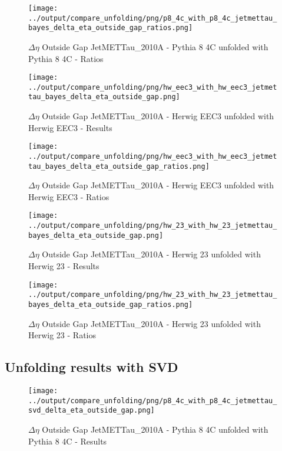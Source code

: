 \documentclass[11pt]{book}
\begin{document}
\begin{figure}[ht]
\centering
\texttt{[image: ../output/compare\_unfolding/png/p8\_4c\_with\_p8\_4c\_jetmettau\_bayes\_delta\_eta\_outside\_gap\_ratios.png]}
\caption{$\Delta\eta$ Outside Gap JetMETTau\_2010A - Pythia 8 4C unfolded with Pythia 8 4C - Ratios}
\label{p8_p8_jetmettau_bayes_delta_eta_outside_gap_b}
\end{figure}

\begin{figure}[ht]
\centering
\texttt{[image: ../output/compare\_unfolding/png/hw\_eec3\_with\_hw\_eec3\_jetmettau\_bayes\_delta\_eta\_outside\_gap.png]}
\caption{$\Delta\eta$ Outside Gap JetMETTau\_2010A - Herwig EEC3 unfolded with Herwig EEC3 - Results}
\label{hw_eec3_hw_eec3_jetmettau_bayes_delta_eta_outside_gap_a}
\end{figure}

\begin{figure}[ht]
\centering
\texttt{[image: ../output/compare\_unfolding/png/hw\_eec3\_with\_hw\_eec3\_jetmettau\_bayes\_delta\_eta\_outside\_gap\_ratios.png]}
\caption{$\Delta\eta$ Outside Gap JetMETTau\_2010A - Herwig EEC3 unfolded with Herwig EEC3 - Ratios}
\label{hw_eec3_hw_eec3_jetmettau_bayes_delta_eta_outside_gap_b}
\end{figure}

\begin{figure}[ht]
\centering
\texttt{[image: ../output/compare\_unfolding/png/hw\_23\_with\_hw\_23\_jetmettau\_bayes\_delta\_eta\_outside\_gap.png]}
\caption{$\Delta\eta$ Outside Gap JetMETTau\_2010A - Herwig 23 unfolded with Herwig 23 - Results}
\label{hw_23_hw_23_jetmettau_bayes_delta_eta_outside_gap_a}
\end{figure}

\begin{figure}[ht]
\centering
\texttt{[image: ../output/compare\_unfolding/png/hw\_23\_with\_hw\_23\_jetmettau\_bayes\_delta\_eta\_outside\_gap\_ratios.png]}
\caption{$\Delta\eta$ Outside Gap JetMETTau\_2010A - Herwig 23 unfolded with Herwig 23 - Ratios}
\label{hw_23_hw_23_jetmettau_bayes_delta_eta_outside_gap_b}
\end{figure}

\clearpage
\subsection{Unfolding results with SVD}

\begin{figure}[ht]
\centering
\texttt{[image: ../output/compare\_unfolding/png/p8\_4c\_with\_p8\_4c\_jetmettau\_svd\_delta\_eta\_outside\_gap.png]}
\caption{$\Delta\eta$ Outside Gap JetMETTau\_2010A - Pythia 8 4C unfolded with Pythia 8 4C - Results}
\label{p8_p8_jetmettau_svd_delta_eta_outside_gap_a}
\end{figure}
\end{document}
